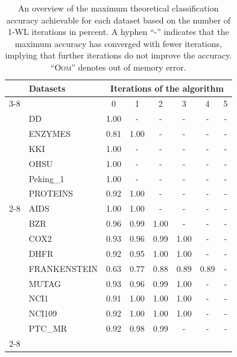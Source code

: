 \begin{table}[H]
	\caption{An overview of the maximum theoretical classification accuracy achievable for each dataset based on the number of 1-WL iterations in percent. A hyphen ``-'' indicates that the maximum accuracy has converged with fewer iterations, implying that further iterations do not improve the accuracy. ``\textsc{Oom}'' denotes out of memory error.}
    \centering
	\label{tab:max_accuracies_app}
	\begin{tabular}{@{}c <{\enspace}@{}lcccccc@{}}	\toprule
			& \multirow{3}{*}{\vspace*{4pt}\textbf{Datasets}}&\multicolumn{6}{c}{\textbf{Iterations of the \wl algorithm}}\\\cmidrule{3-8}
			& & {0}  & {1}  & {2}  & {3} & {4}  & {5}
			\\
			\toprule

			\multirow{4}{*}{\rotatebox{90}{Bioinformatics}}
            & DD &1.00 & - & - & - & - & - \\
            & ENZYMES &0.81 & 1.00 & - & - & - & - \\
            & KKI & 1.00 & - & - & - & - & - \\
            & OHSU & 1.00 & - & - & - & - & - \\
            & Peking\_1 & 1.00 & - & - & - & - & - \\
            & PROTEINS &0.92 & 1.00 & - & - & - & -\\

            \cmidrule{2-8}
            \multirow{9}{*}{\rotatebox{90}{Small molecules}}
            & AIDS & 1.00 & 1.00 & - & - & - & - \\
            & BZR & 0.96 & 0.99 & 1.00 & - & - & - \\
            & COX2 & 0.93 & 0.96 & 0.99 & 1.00 & - & - \\
            & DHFR & 0.92 & 0.95 & 1.00 & 1.00 & - & - \\
            & FRANKENSTEIN & 0.63 & 0.77 & 0.88 & 0.89 & 0.89 & - \\
            & MUTAG &0.93 & 0.96 & 0.99 & 1.00 & - & - \\
            & NCI1 &0.91 & 1.00 & 1.00 & 1.00 & - & - \\
            & NCI109 & 0.92 & 1.00 & 1.00 & 1.00 & - & - \\
            & PTC\_MR &0.92 & 0.98 & 0.99 & - & - & - \\
            \cmidrule{2-8}


\end{tabular}
\end{table}
